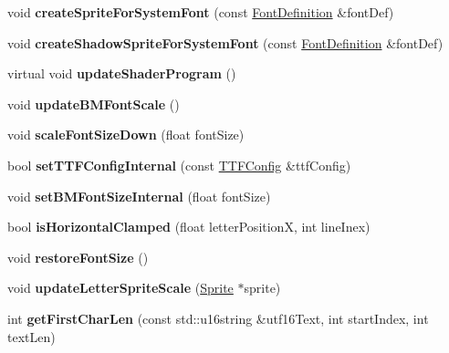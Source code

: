 \begin{DoxyCompactItemize}
void {\bfseries create\+Sprite\+For\+System\+Font} (const \hyperlink{structFontDefinition}{Font\+Definition} \&font\+Def)
\item 
\mbox{\label{classLabel_a162180bdc6b094d8665613b9db6bf3e9}} 
void {\bfseries create\+Shadow\+Sprite\+For\+System\+Font} (const \hyperlink{structFontDefinition}{Font\+Definition} \&font\+Def)
\item 
\mbox{\label{classLabel_aafd9f1642f05050aca3c42b1d1f0886e}} 
virtual void {\bfseries update\+Shader\+Program} ()
\item 
\mbox{\label{classLabel_ab7d2875d2dee0e220b422d7ad1fd64ea}} 
void {\bfseries update\+B\+M\+Font\+Scale} ()
\item 
\mbox{\label{classLabel_a13c95bbf705db3adf837a9691de4e34c}} 
void {\bfseries scale\+Font\+Size\+Down} (float font\+Size)
\item 
\mbox{\label{classLabel_a3733d5baac8cc51e28b2edf0a893fe21}} 
bool {\bfseries set\+T\+T\+F\+Config\+Internal} (const \hyperlink{structTTFConfig}{T\+T\+F\+Config} \&ttf\+Config)
\item 
\mbox{\label{classLabel_abd850b0e8b373f1ccc234fad57ff5dae}} 
void {\bfseries set\+B\+M\+Font\+Size\+Internal} (float font\+Size)
\item 
\mbox{\label{classLabel_ac18c7481ee2b9f2f1d330b7f1463cb66}} 
bool {\bfseries is\+Horizontal\+Clamped} (float letter\+PositionX, int line\+Inex)
\item 
\mbox{\label{classLabel_aa294274db49efae72c8b65e2dfa1940a}} 
void {\bfseries restore\+Font\+Size} ()
\item 
\mbox{\label{classLabel_a0d5de1294145561002c927b8639bf6dd}} 
void {\bfseries update\+Letter\+Sprite\+Scale} (\hyperlink{classSprite}{Sprite} $\ast$sprite)
\item 
\mbox{\label{classLabel_a421a42b257dc87e437301ee5100c6533}} 
int {\bfseries get\+First\+Char\+Len} (const std\+::u16string \&utf16\+Text, int start\+Index, int text\+Len)
\item 

\end{DoxyCompactItemize}
